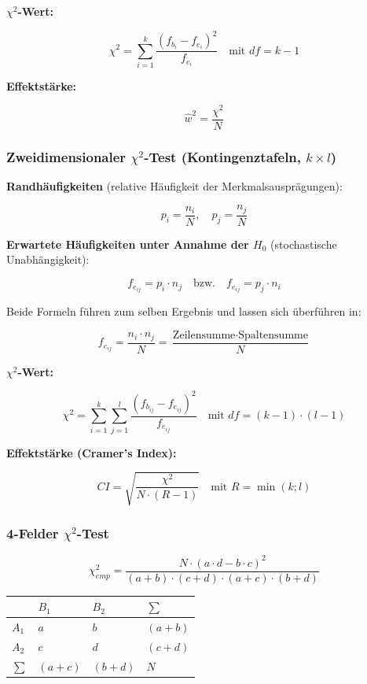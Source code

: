 \documentclass[
]{article}
\newcounter{none} %
\begin{document}
\textbf{\(\chi^2\)-Wert:}

\[\chi^2 = \sum_{i=1}^{k} \frac{(f_{b_i} - f_{e_i})^2}{f_{e_i}} \quad \text{mit } df = k - 1\]

\textbf{Effektstärke:}

\[\hat{w}^2 = \frac{\chi^2}{N}\]

\subsubsection{\texorpdfstring{Zweidimensionaler \(\chi^2\)-Test
(Kontingenztafeln,
\(k \times l\))}{Zweidimensionaler \textbackslash chi\^{}2-Test (Kontingenztafeln, k \textbackslash times l)}}\label{zweidimensionaler-chi2-test-kontingenztafeln-k-times-l}

\textbf{Randhäufigkeiten} (relative Häufigkeit der
Merkmalsausprägungen):

\[p_i = \frac{n_i}{N}, \quad p_j = \frac{n_j}{N}\]

\textbf{Erwartete Häufigkeiten unter Annahme der \(H_0\)} (stochastische
Unabhängigkeit):

\[f_{e_{ij}} = p_i \cdot n_j \quad \text{bzw.} \quad f_{e_{ij}} = p_j \cdot n_i\]

Beide Formeln führen zum selben Ergebnis und lassen sich überführen in:

\[f_{e_{ij}} = \frac{n_i \cdot n_j}{N} = \frac{\text{Zeilensumme} \cdot \text{Spaltensumme}}{N}\]

\textbf{\(\chi^2\)-Wert:}

\[\chi^2 = \sum_{i=1}^{k} \sum_{j=1}^{l} \frac{(f_{b_{ij}} - f_{e_{ij}})^2}{f_{e_{ij}}} \quad \text{mit } df = (k-1) \cdot (l-1)\]

\textbf{Effektstärke (Cramer's Index):}

\[CI = \sqrt{\frac{\chi^2}{N \cdot (R - 1)}} \quad \text{mit } R = \min(k; l)\]

\subsubsection{\texorpdfstring{4-Felder
\(\chi^2\)-Test}{4-Felder \textbackslash chi\^{}2-Test}}\label{felder-chi2-test}

\[\chi^2_{emp} = \frac{N \cdot (a \cdot d - b \cdot c)^2}{(a + b) \cdot (c + d) \cdot (a + c) \cdot (b + d)}\]

{\def\LTcaptype{none} %
\begin{longtable}[]{@{}llll@{}}
\toprule\noalign{}
& \(B_1\) & \(B_2\) & \(\sum\) \\
\midrule\noalign{}
\endhead
\bottomrule\noalign{}
\endlastfoot
\(A_1\) & \(a\) & \(b\) & \((a+b)\) \\
\(A_2\) & \(c\) & \(d\) & \((c+d)\) \\
\(\sum\) & \((a+c)\) & \((b+d)\) & \(N\) \\
\end{longtable}
}
\end{document}
